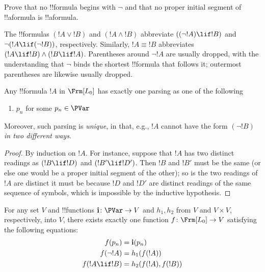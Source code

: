 \documentclass[../../../include/open-logic-section]{subfiles}
\begin{document}
\begin{prob} 
Prove that no !!{formula} begins with $\lnot$ and that no proper
initial segment of !!a{formula} is !!a{formula}.
\end{prob}

\begin{explain}
The !!{formula}s $(!A \lor !B)$ and $(!A \land !B)$ abbreviate
$((\lnot !A) \lif !B)$ and $\lnot(!A \lif (\lnot !B))$,
respectively. Similarly, $!A \equiv !B$ abbreviates $(!A \lif !B)
\land (!B \lif !A)$. Parentheses around $\lnot !A$ are usually dropped,
with the understanding that $\lnot$ binds the shortest !!{formula}
that follows it; outermost parentheses are likewise usually dropped.
\end{explain}
 
\begin{prop}
Any !!{formula} $!A$ in $ \Frm[L_0]$ has
exactly one parsing as one of the following
\begin{enumerate}
\item $p_n$ for some $p_n \in  \PVar$
\end{enumerate}
Moreover, such parsing is \emph{unique}, in that, e.g., $!A$ cannot
have the form $(\lnot !B)$ \emph{ in two different ways}.
\end{prop}

\begin{proof}
By induction on $!A$. For instance, suppose that $!A$ has
two distinct readings as $(!B \lif !D)$ and $(!B' \lif
!D')$. Then $!B$ and $!B'$ must be the same (or else one would
be a proper initial segment of the other); so is the two readings of
$!A$ are distinct it must be because $!D$ and $!D'$ are
distinct readings of the same sequence of symbols, which is impossible
by the inductive hypothesis. 
\end{proof}

\begin{thm} 
For any set $V$ and !!{function}s $\mathbf{i} \colon \PVar \to V$ and
$h_1, h_2$ from $V$ and $V \times V$, respectively, into $V$, there
exists exactly one function $f \colon \Frm[L_0] \to V$ satisfying the
following equations:
\begin{align*}
  f(p_n) &= \mathbf{i}(p_n) \\
  f(\lnot !A) &= h_1(f(!A))\\
  f(!A \lif !B) &= h_2(f(!A),f(!B))
\end{align*}
\end{thm}
\end{document}

